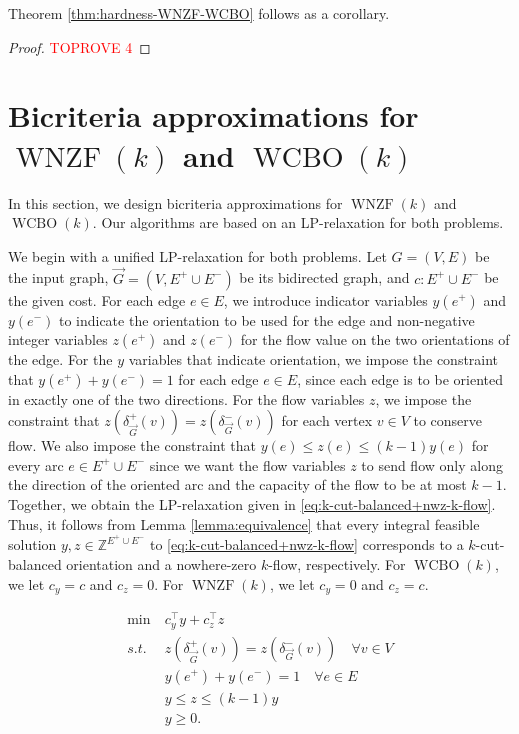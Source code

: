 \documentclass[11pt]{article}
\newcommand{\Z}{\mathbb{Z}}
\begin{document}
Theorem \ref{thm:hardness-WNZF-WCBO} follows as a corollary.
\begin{proof}\textcolor{red}{TOPROVE 4}\end{proof}








\section{Bicriteria approximations for $\operatorname{WNZF}(k)$ and $\operatorname{WCBO}(k)$}\label{sec:algo-WNZF+WCBO}
In this section, we design bicriteria approximations for $\operatorname{WNZF}(k)$ and $\operatorname{WCBO}(k)$. Our algorithms are based on an LP-relaxation for both problems. 

We begin with a unified LP-relaxation for both problems. 
Let $G=(V, E)$ be the input graph, $\vec{G}=(V,E^+\cup E^-)$ be its bidirected graph, and $c: E^+ \cup E^-$ be the given cost. For each edge $e\in E$, we introduce indicator variables $y(e^+)$ and $y(e^-)$ to indicate the orientation to be used for the edge and non-negative integer variables $z(e^+)$ and $z(e^-)$ for the flow value on the two orientations of the edge. For the $y$ variables that indicate orientation, we impose the constraint that $y(e^+) + y(e^-)=1$ for each edge $e\in E$, since each edge is to be oriented in exactly one of the two directions. For the flow variables $z$, we impose the constraint that $z(\delta_{\vec{G}}^+(v))=z(\delta_{\vec{G}}^-(v))$ for each vertex $v\in V$ to conserve flow. We also impose the constraint that $y(e)\le z(e)\le (k-1)y(e)$ for every arc $e\in E^+\cup E^-$ since we want the flow variables $z$ to send flow only along the direction of the oriented arc and the capacity of the flow to be at most $k-1$. Together, we obtain the LP-relaxation given in \eqref{eq:k-cut-balanced+nwz-k-flow}. 
Thus, it follows from Lemma \ref{lemma:equivalence} that every integral feasible solution $y,z\in \Z^{E^+\cup E^-}$ to \eqref{eq:k-cut-balanced+nwz-k-flow} corresponds to a $k$-cut-balanced orientation and a nowhere-zero $k$-flow, respectively. 
For $\operatorname{WCBO}(k)$, we let $c_y=c$ and $c_z=0$. For $\operatorname{WNZF}(k)$, we let $c_y=0$ and $c_z=c$.

\begin{equation}\label{eq:k-cut-balanced+nwz-k-flow}
    \begin{aligned}
    \min~&c_y^\intercal y+c_z^\intercal z\\
    s.t.~&z(\delta_{\vec{G}}^+(v))=z(\delta_{\vec{G}}^-(v))\quad \forall v\in V\\
    &y(e^+)+y(e^-)=1\quad \forall e\in E\\
    &y\leq z\leq (k-1)y\\
        &y\geq 0.
    \end{aligned}
\end{equation}
\end{document}
